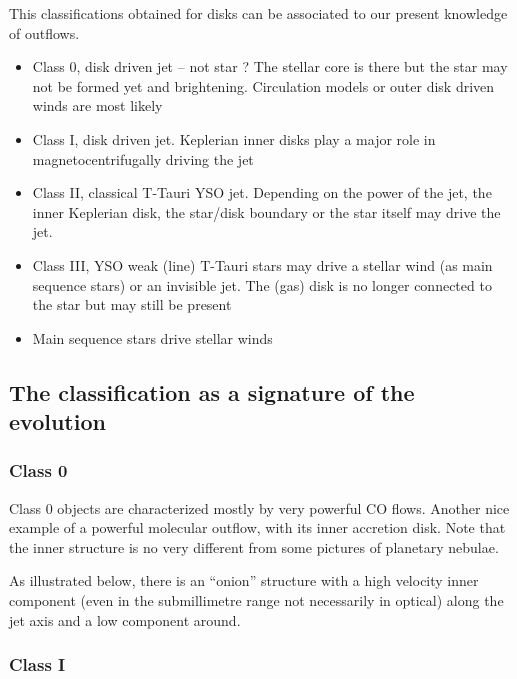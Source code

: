 \documentclass[10pt,a4paper,english]{article}
\begin{document}
This classifications obtained for disks can be associated to our present
knowledge of outflows.
\begin{itemize}
    \item Class 0, disk driven jet -- not star ? The stellar core is there but
          the star may not be formed yet and brightening. Circulation models or
          outer disk driven winds are most likely
    \item Class I, disk driven jet. Keplerian inner disks play a major role in
          magnetocentrifugally driving the jet
    \item Class II, classical T-Tauri YSO jet. Depending on the power of the
          jet, the inner Keplerian disk, the star/disk boundary or the star
          itself may drive the jet.
    \item Class III, YSO weak (line) T-Tauri stars may drive a stellar wind (as
          main sequence stars) or an invisible jet. The (gas) disk is no longer
          connected to the star but may still be present
    \item Main sequence stars drive stellar winds
\end{itemize}

\subsection{The classification as a signature of the evolution}

\subsubsection{Class 0}

Class 0 objects are characterized mostly by very powerful CO flows. Another
nice example of a powerful molecular outflow, with its inner accretion disk.
Note that the inner structure is no very different from some pictures of
planetary nebulae.


As illustrated below, there is an ``onion'' structure with a high velocity
inner component (even in the submillimetre range not necessarily in optical)
along the jet axis and a low component around.


\subsubsection{Class I}
\end{document}
